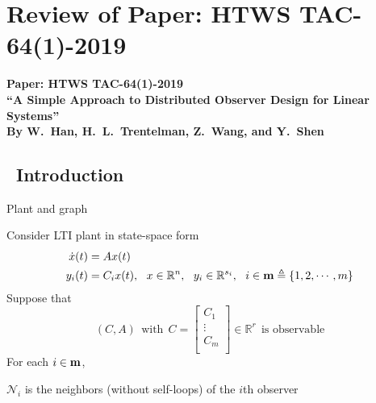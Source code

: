 \documentclass{beamer}
\newcommand{\R}{\mathbb{R}}
\begin{document}
\section{Review of Paper: HTWS TAC-64(1)-2019}%

\begin{frame}
\thispagestyle{empty}

\begin{center}
{\large\bf\color{blue}Paper: HTWS TAC-64(1)-2019 \\
{\footnotesize ``A Simple Approach to Distributed Observer Design for Linear Systems''} \\
{\footnotesize By W.~Han, H.~L.~Trentelman, Z.~Wang, and Y.~Shen}}
\end{center}
\end{frame}



\subsection{~Introduction}%

\begin{frame}{\color{blue} Plant and graph}

Consider LTI plant in state-space form
\begin{align*}
\dot{x}(t)&=A x(t) \\
y_{i}(t)&=C_{i}x(t),~~ x\in\R^{n},~~ y_{i}\in\R^{s_{i}},~~ i\in{\bf m}\triangleq \{1,2,\cdots,m\}
\end{align*}
Suppose that
\begin{equation*}
(C,A) ~~\text{with}~~ C=\begin{bmatrix} C_{1} \\ \vdots \\ C_{m} \\   \end{bmatrix}\in\R^{r} ~~\text{is observable}
\end{equation*}
For each $i\in{\bf m}$,
\begin{center}
$\mathcal{N}_{i}$ is the neighbors (without self-loops) of the $i$th observer
\end{center}
\end{frame}
\end{document}
